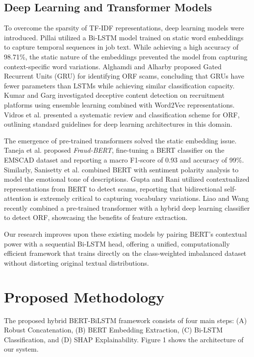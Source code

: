 \documentclass[conference]{IEEEtran}
\begin{document}
\subsection{Deep Learning and Transformer Models}
To overcome the sparsity of TF-IDF representations, deep learning models were introduced. Pillai \cite{pillai2023detecting} utilized a Bi-LSTM model trained on static word embeddings to capture temporal sequences in job text. While achieving a high accuracy of 98.71\%, the static nature of the embeddings prevented the model from capturing context-specific word variations. Alghamdi and Alharby \cite{alghamdi2019online} proposed Gated Recurrent Units (GRU) for identifying ORF scams, concluding that GRUs have fewer parameters than LSTMs while achieving similar classification capacity. Kumar and Garg \cite{kumar2022deceptive} investigated deceptive content detection on recruitment platforms using ensemble learning combined with Word2Vec representations. Vidros et al. \cite{vidros2017online} presented a systematic review and classification scheme for ORF, outlining standard guidelines for deep learning architectures in this domain.

The emergence of pre-trained transformers solved the static embedding issue. Taneja et al. \cite{taneja2025fraud} proposed \textit{Fraud-BERT}, fine-tuning a BERT classifier on the EMSCAD dataset and reporting a macro F1-score of 0.93 and accuracy of 99\%. Similarly, Sanisetty et al. \cite{sanisetty2025comprehensive} combined BERT with sentiment polarity analysis to model the emotional tone of descriptions. Gupta and Rani \cite{gupta2021contextualized} utilized contextualized representations from BERT to detect scams, reporting that bidirectional self-attention is extremely critical to capturing vocabulary variations. Liao and Wang \cite{liao2023online} recently combined a pre-trained transformer with a hybrid deep learning classifier to detect ORF, showcasing the benefits of feature extraction.

Our research improves upon these existing models by pairing BERT's contextual power with a sequential Bi-LSTM head, offering a unified, computationally efficient framework that trains directly on the class-weighted imbalanced dataset without distorting original textual distributions.

\section{Proposed Methodology}
The proposed hybrid BERT-BiLSTM framework consists of four main steps: (A) Robust Concatenation, (B) BERT Embedding Extraction, (C) Bi-LSTM Classification, and (D) SHAP Explainability. Figure 1 shows the architecture of our system.
\end{document}
